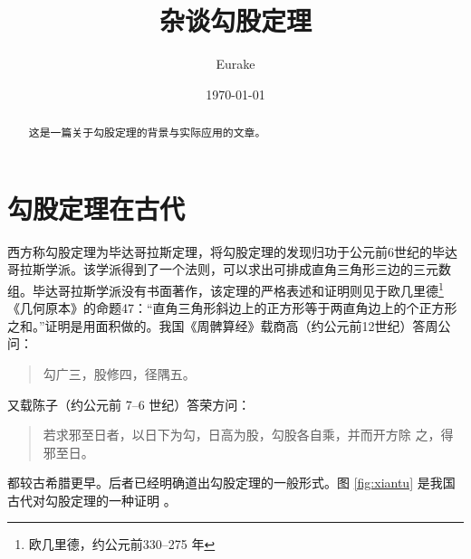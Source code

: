 \documentclass[fontset=windows, 12pt]{article}
\title{杂谈勾股定理}
\author{Eurake}
\date{\today}
\newenvironment{myquote}
	{\begin{quote}
		\kaishu
		\zihao{-5}
	}
	{\end{quote}}
\begin{document}
\maketitle
\tableofcontents
\newpage

\begin{abstract}
	这是一篇关于勾股定理的背景与实际应用的文章。
\end{abstract}

\vspace*{4em}
\section{勾股定理在古代}
西方称勾股定理为毕达哥拉斯定理，将勾股定理的发现归功于公元前6世纪的毕达哥拉斯学派\cite{Kline}。该学派得到了一个法则，可以求出可排成直角三角形三边的三元数组。毕达哥拉斯学派没有书面著作，该定理的严格表述和证明则见于欧几里德\footnote{欧几里德，约公元前330--275 年}
《几何原本》的命题47：“直角三角形斜边上的正方形等于两直角边上的个正方形之和。”证明是用面积做的。我国《周髀算经》载商高（约公元前12世纪）答周公问：

\begin{myquote}
	勾广三，股修四，径隅五。
\end{myquote}

又载陈子（约公元前 7--6 世纪）答荣方问：

\begin{quote}
	\kaishu
	若求邪至日者，以日下为勾，日高为股，勾股各自乘，并而开方除	 之，得邪至日。
\end{quote}

都较古希腊更早。后者已经明确道出勾股定理的一般形式。图 \ref{fig:xiantu} 是我国古代对勾股定理的一种证明 \cite{quanjing}。

\end{document}
